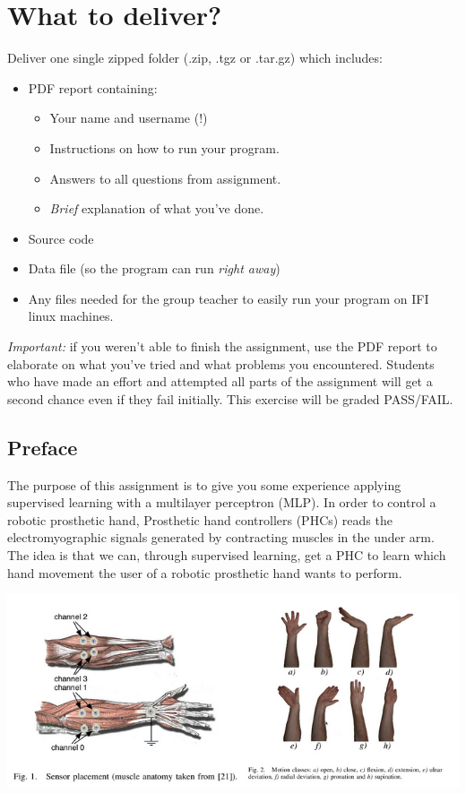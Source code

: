 \section*{What to deliver?}
Deliver one single zipped folder (.zip, .tgz or .tar.gz) which includes:
\begin{itemize}
    \item PDF report containing:
    \begin{itemize}
        \item Your name and username (!)
        \item Instructions on how to run your program.
        \item Answers to all questions from assignment.
        \item \emph{Brief} explanation of what you've done.
    \end{itemize}
    \item Source code
    \item Data file (so the program can run \emph{right away})
    \item Any files needed for the group teacher to easily run your program on
          IFI linux machines.
\end{itemize}
\emph{Important: } if you weren't able to finish the assignment, use the PDF
report to elaborate on what you've tried and what problems you encountered.
Students who have made an effort and attempted all parts of the assignment
will get a second chance even if they fail initially. This exercise will be
graded PASS/FAIL.

\subsection*{Preface}
The purpose of this assignment is to give you some experience applying supervised learning with a multilayer perceptron (MLP).
In order to control a robotic prosthetic hand, Prosthetic hand controllers (PHCs) reads the electromyographic signals generated by contracting muscles in the under arm.
The idea is that we can, through supervised learning, get a PHC to learn which hand movement the user of a robotic prosthetic hand wants to perform.

\begin{center}
    \includegraphics[scale=0.8]{figures/handfigures.png}
\end{center}

